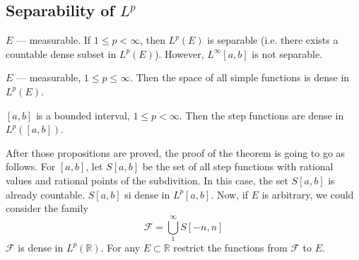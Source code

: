 \subsection{Separability of $L^p$}
\begin{theorem}
    $E$ --- measurable. If $1 \le p < \infty$, then $L^p(E)$ is separable
    (i.e. there exists a countable dense subset in $L^p(E)$).
    However, $L^\infty[a, b]$ is not separable.
\end{theorem}
\begin{proposition}
    $E$ --- measurable, $1 \le p \le \infty$. Then the space of all simple functions is
    dense in $L^p(E)$.
\end{proposition}
\begin{proposition}
    $[a, b]$ is a bounded interval, $1 \le p < \infty$. Then the step functions are dense
    in $L^p([a, b])$.
\end{proposition}

After those propositions are proved, the proof of the theorem is going to go as follows.
For $[a, b]$, let $S[a, b]$ be the set of all step functions with rational values
and rational points of the subdivition. In this case, the set $S[a, b]$ is already countable.
$S[a, b]$ si dense in $L^p[a, b]$. Now, if $E$ is arbitrary, 
we could consider the family 
\[ \mathcal{F} = \bigcup_1^\infty S[-n, n] \]
$\mathcal{F}$ is dense in $L^p(\mathbb{R})$.
For any $E \subset \mathbb{R}$ restrict the functions from
$\mathcal{F}$ to $E$.

